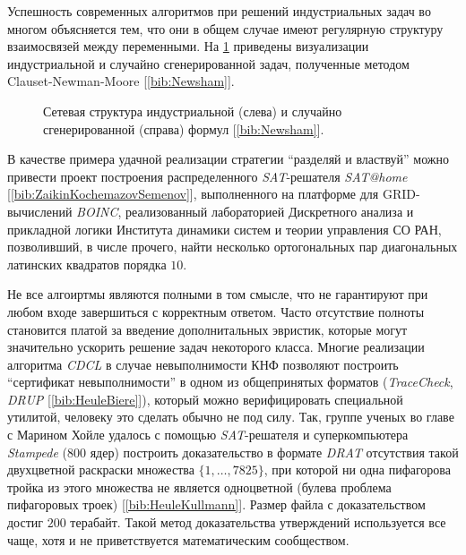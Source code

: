 Успешность современных алгоритмов при решений индустриальных задач во многом объясняется тем, что они в общем случае имеют регулярную структуру взаимосвязей между переменными. На \figurename{ \ref{chapter1:fig:satgraph}} приведены визуализации индустриальной и случайно сгенерированной задач, полученные методом Clauset-Newman-Moore [\ref{bib:Newsham}].

\begin{figure}[h]
\centering
\captionsetup{justification=centering}
\caption{Сетевая структура индустриальной (слева) и случайно сгенерированной (справа) формул [\ref{bib:Newsham}].}
\label{chapter1:fig:satgraph}
\end{figure}

В качестве примера удачной реализации стратегии \enquote{разделяй и властвуй} можно привести проект построения распределенного \textit{SAT}-решателя \textit{SAT@home} [\ref{bib:ZaikinKochemazovSemenov}], выполненного на платформе для GRID-вычислений \textit{BO\-INC}, реализованный лабораторией Дискретного анализа и прикладной логики Института динамики систем и теории управления СО РАН, позволивший, в числе прочего, найти несколько ортогональных пар диагональных латинских квадратов порядка $10$.

Не все алгоиртмы являются полными в том смысле, что не гарантируют при любом входе завершиться с корректным ответом. Часто отсутствие полноты становится платой за введение дополнитальных эвристик, которые могут значительно ускорить решение задач некоторого класса. 
Многие реализации алгоритма \textit{CDCL} в случае невыполнимости КНФ позволяют построить \enquote{сертификат невыполнимости} в одном из общепринятых форматов (\textit{TraceCheck}, \textit{DRUP} [\ref{bib:HeuleBiere}]), который можно верифицировать специальной утилитой, человеку это сделать обычно не под силу. 
Так, группе ученых во главе с Марином Хойле удалось с помощью \textit{SAT}-решателя и суперкомпьютера \textit{Stampede} ($800$ ядер) построить доказательство в формате \textit{DRAT} отсутствия такой двухцветной раскраски множества $\{1, \dots, 7825\}$, при которой ни одна пифагорова тройка из этого множества не является одноцветной (булева проблема пифагоровых троек) [\ref{bib:HeuleKullmann}]. 
Размер файла с доказательством достиг $200$ терабайт. Такой метод доказательства утверждений используется все чаще, хотя и не приветствуется математическим сообществом.


